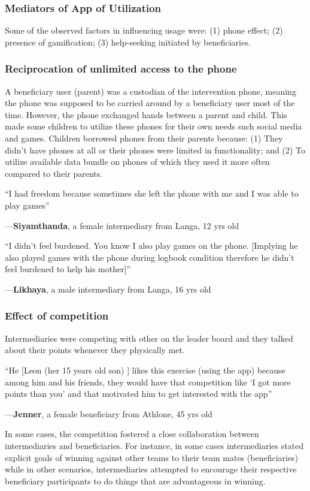\documentclass{sig-alternate}
\newenvironment{myquote}
               {\list{}{\rightmargin   \leftmargin
                        \parsep        0in }%
                \item\relax}
               {\endlist}
\newcommand{\userquote}[2]{\begin{samepage}\begin{myquote} 
     \em{\small{#2\begin{flushright}---#1\end{flushright}}}
   \end{myquote}\end{samepage}}
\begin{document}
\subsubsection{Mediators of App of Utilization}
Some of the observed factors in influencing usage were: (1) phone effect; (2) presence of gamification; (3) help-seeking initiated by beneficiaries.
\subsubsection*{\textbf{Reciprocation of unlimited access to the phone}}
A beneficiary user (parent) was a custodian of the intervention phone, meaning the phone was supposed to be carried around by a beneficiary user most of the time. However, the phone exchanged hands between a parent and child. This made some children to utilize these phones for their own needs such social media and games. Children borrowed phones from their parents because: (1) They didn't have phones at all or their phones were limited in functionality; and (2) To utilize available data bundle on phones of which they used it more often compared to their parents.

\userquote{\textbf{Siyamthanda}, a female intermediary from Langa, 12 yrs old} {``I had freedom because sometimes she left the phone with me and I was able to play games''}

\userquote{\textbf{Likhaya}, a male intermediary from Langa, 16 yrs old} {``I didn't feel burdened. You know I also play games on the phone. [Implying he also played games with the phone during logbook condition therefore he didn't feel burdened to help his mother]''} 
\subsubsection*{\textbf{Effect of competition}}
Intermediaries were competing with other on the leader board and they talked about their points whenever they physically met.

\userquote{\textbf{Jenner}, a female beneficiary from Athlone, 45 yrs old} {``He [Leon (her 15 years old son) ] likes this exercise (using the app) because among him and his friends, they would have that competition like `I got more points than you' and that motivated him to get interested with the app''} 

In some cases, the competition fostered a close collaboration between intermediaries and beneficiaries. For instance, in some cases intermediaries stated explicit goals of winning against other teams to their team mates (beneficiaries) while in other scenarios, intermediaries attempted to encourage their respective beneficiary participants to do things that are advantageous in winning.
\end{document}
